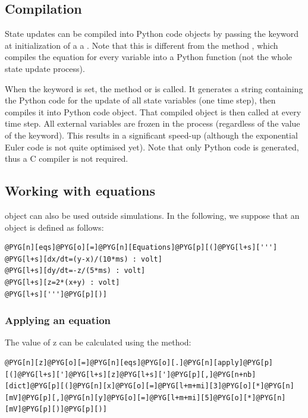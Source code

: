 \documentclass[letterpaper,10pt,english]{manual}
\begin{document}
\subsection{Compilation}

State updates can be compiled into Python code objects by passing the keyword
 at initialization of a a \hyperlink{brian.NeuronGroup}{}.
Note that this is different from the method ,
which compiles the equation for every variable into a Python function
(not the whole state update process).

When the  keyword is set, the method 
or  is called. It generates
a string containing the Python code for the update of all state variables (one time step),
then compiles it into Python code object. That compiled object is then called at every time step.
All external variables are frozen in the process (regardless of the value of the  keyword).
This results in a significant speed-up (although the exponential Euler code is not
quite optimised yet). Note that only Python code is generated, thus a
C compiler is not required.


\subsection{Working with equations}

\hyperlink{brian.Equations}{} object can also be used outside simulations.
In the following, we suppose that an \hyperlink{brian.Equations}{} object is defined as follows:

\begin{Verbatim}[commandchars=@\[\]]
@PYG[n][eqs]@PYG[o][=]@PYG[n][Equations]@PYG[p][(]@PYG[l+s][''']
@PYG[l+s][dx/dt=(y-x)/(10*ms) : volt]
@PYG[l+s][dy/dt=-z/(5*ms) : volt]
@PYG[l+s][z=2*(x+y) : volt]
@PYG[l+s][''']@PYG[p][)]
\end{Verbatim}

\hypertarget{index-17}{}\subsubsection{Applying an equation}

The value of z can be calculated using the  method:

\begin{Verbatim}[commandchars=@\[\]]
@PYG[n][z]@PYG[o][=]@PYG[n][eqs]@PYG[o][.]@PYG[n][apply]@PYG[p][(]@PYG[l+s][']@PYG[l+s][z]@PYG[l+s][']@PYG[p][,]@PYG[n+nb][dict]@PYG[p][(]@PYG[n][x]@PYG[o][=]@PYG[l+m+mi][3]@PYG[o][*]@PYG[n][mV]@PYG[p][,]@PYG[n][y]@PYG[o][=]@PYG[l+m+mi][5]@PYG[o][*]@PYG[n][mV]@PYG[p][)]@PYG[p][)]
\end{Verbatim}
\end{document}
